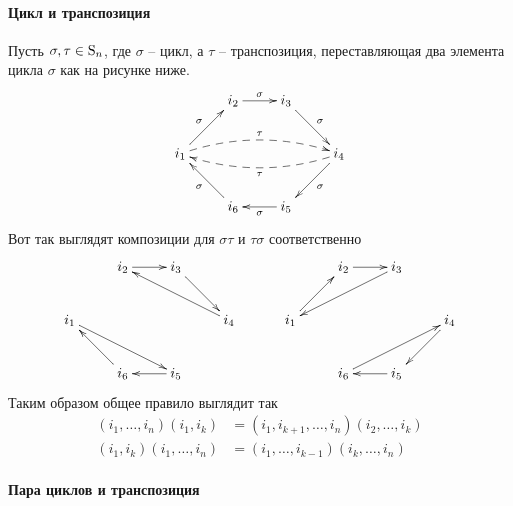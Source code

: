 \paragraph{Цикл и транспозиция}

Пусть $\sigma,\tau\in\operatorname{S}_{n}$, где $\sigma$ -- цикл, а $\tau$ -- транспозиция, переставляющая два элемента цикла $\sigma$ как на рисунке ниже.
\[
\xymatrix{
	{}&{i_2}\ar[r]^{\sigma}&{i_3}\ar[rd]^{\sigma}&{}\\
	{i_1}\ar[ur]^{\sigma}\ar@{-->}@/^10pt/[rrr]^{\tau}&{}&{}&{i_4}\ar[dl]^{\sigma}\ar@{-->}@/^10pt/[lll]^{\tau}\\
	{}&{i_6}\ar[ul]^{\sigma}&{i_5}\ar[l]^{\sigma}&{}\\
}
\]
Вот так выглядят композиции для $\sigma\tau$ и $\tau\sigma$ соответственно
\[
\xymatrix{
	{}&{i_2}\ar[r]&{i_3}\ar[dr]&{}\\
	{i_1}\ar[drr]&{}&{}&{i_4}\ar[ull]\\
	{}&{i_6}\ar[ul]&{i_5}\ar[l]&{}\\
}
\quad\quad\quad
\xymatrix{
	{}&{i_2}\ar[r]&{i_3}\ar[dll]&{}\\
	{i_1}\ar[ur]&{}&{}&{i_4}\ar[dl]\\
	{}&{i_6}\ar[urr]&{i_5}\ar[l]&{}\\
}
\]
Таким образом общее правило выглядит так 
\begin{align*}
(i_1,\ldots,i_n)(i_1,i_k) &= (i_1,i_{k+1},\ldots,i_n)(i_2,\ldots,i_k)\\
(i_1,i_k)(i_1,\ldots,i_n) &= (i_1,\ldots,i_{k-1})(i_k,\ldots,i_n)
\end{align*}

\paragraph{Пара циклов и транспозиция}

